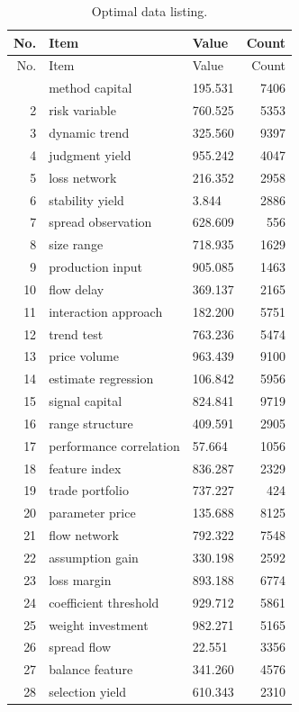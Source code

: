 \documentclass[11pt]{report}
\begin{document}
\begin{longtable}{rllr}\caption{Optimal data listing.}\label{tab:l1}\\\toprule No. & Item & Value & Count \\ \midrule \endfirsthead\toprule No. & Item & Value & Count \\ \midrule \endhead\bottomrule \endfoot
1 & method capital & 195.531 & 7406 \\
2 & risk variable & 760.525 & 5353 \\
3 & dynamic trend & 325.560 & 9397 \\
4 & judgment yield & 955.242 & 4047 \\
5 & loss network & 216.352 & 2958 \\
6 & stability yield & 3.844 & 2886 \\
7 & spread observation & 628.609 & 556 \\
8 & size range & 718.935 & 1629 \\
9 & production input & 905.085 & 1463 \\
10 & flow delay & 369.137 & 2165 \\
11 & interaction approach & 182.200 & 5751 \\
12 & trend test & 763.236 & 5474 \\
13 & price volume & 963.439 & 9100 \\
14 & estimate regression & 106.842 & 5956 \\
15 & signal capital & 824.841 & 9719 \\
16 & range structure & 409.591 & 2905 \\
17 & performance correlation & 57.664 & 1056 \\
18 & feature index & 836.287 & 2329 \\
19 & trade portfolio & 737.227 & 424 \\
20 & parameter price & 135.688 & 8125 \\
21 & flow network & 792.322 & 7548 \\
22 & assumption gain & 330.198 & 2592 \\
23 & loss margin & 893.188 & 6774 \\
24 & coefficient threshold & 929.712 & 5861 \\
25 & weight investment & 982.271 & 5165 \\
26 & spread flow & 22.551 & 3356 \\
27 & balance feature & 341.260 & 4576 \\
28 & selection yield & 610.343 & 2310 \\

\end{longtable}
\end{document}
